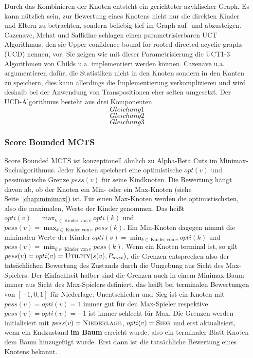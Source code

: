 Durch das Kombinieren der Knoten entsteht ein gerichteter azyklischer Graph. Es kann nützlich sein, zur Bewertung eines Knotens nicht nur die direkten Kinder und Eltern zu betrachten, sondern beliebig tief im Graph auf- und abzusteigen. Cazenave, Mehat und Saffidine schlagen einen parametrisierbaren UCT Algorithmus, den sie Upper confidence bound for rooted directed acyclic graphs (UCD) nennen, vor. Sie zeigen wie mit dieser Parametrisierung die UCT1-3 Algorithmen von Childs u.a. implementiert werden können. Cazenave u.a. argumentieren dafür, die Statistiken nicht in den Knoten sondern in den Kanten zu speichern, dies kann allerdings die Implementierung verkomplizieren und wird deshalb bei der Anwendung von Transpositionen eher selten umgesetzt.
Der UCD-Algorithmus besteht aus drei Komponenten.
\begin{equation}
Gleichung1
\label{eqn:ucd1}
\end{equation}
\begin{equation}
Gleichung2
\label{eqn:ucd2}
\end{equation}
\begin{equation}
Gleichung3
\label{eqn:ucd3}
\end{equation}


\subsubsection{Score Bounded MCTS}
\label{chap:scorebounded}
Score Bounded MCTS ist konzeptionell ähnlich zu Alpha-Beta Cuts im Minimax-Suchalgorithmus.
Jeder Knoten speichert eine optimistische $opt(v)$ und pessimistische Grenze $pess(v)$ für seine Kindknoten.
Die Bewertung hängt davon ab, ob der Knoten ein Min- oder ein Max-Knoten (siehe Seite~\ref{chap:minimax}) ist.
Für einen Max-Knoten werden die optimistischsten, also die maximalen, Werte der Kinder genommen.
Das heißt $opti(v) = \max_{k \in\ \text{Kinder von}\ v}opti(k)$ und $pess(v) = \max_{k \in\ \text{Kinder von}\ v}pess(k)$.
Ein Min-Knoten dagegen nimmt die minimalen Werte der Kinder $opti(v) = \min_{k \in\ \text{Kinder von}\ v}opti(k)$ und $pess(v) = \min_{k \in\ \text{Kinder von}\ v}pess(k)$.
Wenn ein Knoten terminal ist, so gilt $pess(v) = opti(v) = \textsc{Utility}(s(v),P_{max})$, die Grenzen entsprechen also der tatsächlichen Bewertung des Zustands durch die Umgebung aus Sicht des Max-Spielers. Der Einfachheit halber sind die Grenzen auch in einem Minimax-Baum immer aus Sicht des Max-Spielers definiert, das heißt bei terminalen Bewertungen von $[-1, 0, 1]$ für Niederlage, Unentschieden und Sieg ist ein Knoten mit $pess(v) = opti(v) = 1$ immer gut für den Max-Spieler respektive $pess(v) = opti(v) = -1$ ist immer schlecht für Max. Die Grenzen werden initialisiert mit $pess(v) = \textsc{Niederlage}$, $opti(v) = \textsc{Sieg}$ und erst aktualisiert, wenn ein Endzustand \textbf{im Baum} erreicht wurde, also ein terminaler Blatt-Knoten dem Baum hinzugefügt wurde.
Erst dann ist die tatsächliche Bewertung eines Knotens bekannt.

